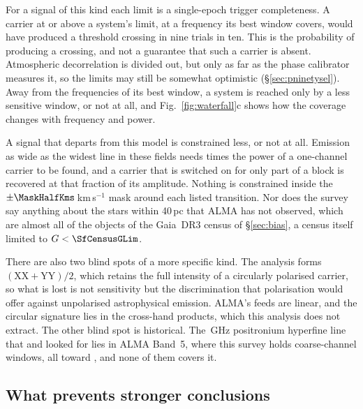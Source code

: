 For a signal of this kind each limit is a single-epoch trigger
completeness. A carrier at or above a system's limit, at a frequency its
best window covers, would have produced a threshold crossing in nine trials
in ten. This is the probability of producing a crossing, and not a
guarantee that such a carrier is absent. Atmospheric decorrelation is
divided out, but only as far as the phase calibrator measures it, so the
limits may still be somewhat optimistic (\S\ref{sec:pninetysel}).
Away from the frequencies of its best window, a system is reached only by a
less sensitive window, or not at all, and Fig.~\ref{fig:waterfall}c shows
how the coverage changes with frequency and power.

A signal that departs from this model is constrained less, or not at all.
Emission as wide as the widest line in these fields needs \ScNBroadRatio{}
times the power of a one-channel carrier to be found, and a carrier that is
switched on for only part of a block is recovered at that fraction of its
amplitude. Nothing is constrained inside the $\pm\MaskHalfKms$\,km\,s$^{-1}$
mask around each listed transition. Nor does the survey say anything about
the stars within 40\,pc that ALMA has not observed, which are almost all of
the \NGaiaCensus{} objects of the Gaia~DR3 census of \S\ref{sec:bias}, a
census itself limited to $G<\SfCensusGLim$.

There are also two blind spots of a more specific kind. The analysis forms
$(\mathrm{XX}+\mathrm{YY})/2$, which retains the full intensity of a
circularly polarised carrier, so what is lost is not sensitivity but the
discrimination that polarisation would offer against unpolarised
astrophysical emission. ALMA's feeds are linear, and the circular signature
lies in the cross-hand products, which this analysis does not extract. The
other blind spot is historical. The \SbPriorFreqGHz\,GHz positronium
hyperfine line that \citet{Steffes1994} and \citet{Mauersberger1996} looked
for lies in ALMA Band~5, where this survey holds \LnBFiveWin{} coarse-channel
windows, all toward \LnBFiveStars, and none of them covers it.

\subsection{What prevents stronger conclusions}
\label{sec:mmdifferent}

